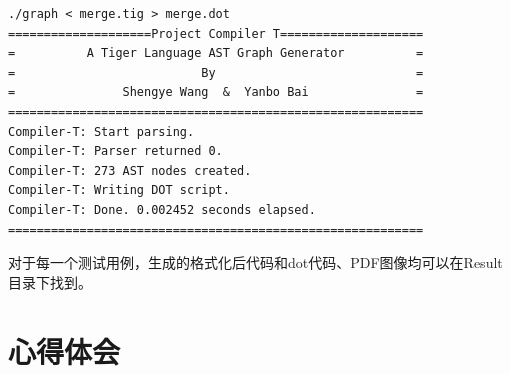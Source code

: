 \begin{verbatim}
./graph < merge.tig > merge.dot
====================Project Compiler T====================
=          A Tiger Language AST Graph Generator          =
=                          By                            =
=               Shengye Wang  &  Yanbo Bai               =
==========================================================
Compiler-T: Start parsing.
Compiler-T: Parser returned 0.
Compiler-T: 273 AST nodes created.
Compiler-T: Writing DOT script.
Compiler-T: Done. 0.002452 seconds elapsed.
==========================================================
\end{verbatim}

对于每一个测试用例，生成的格式化后代码和dot代码、PDF图像均可以在Result目录下找到。

\section{心得体会}




